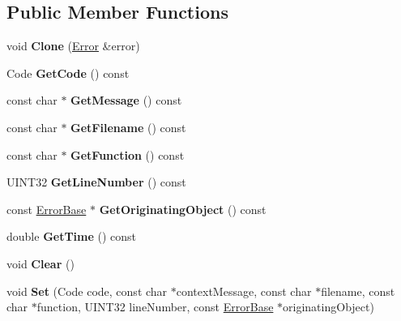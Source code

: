 \subsection*{Public Member Functions}
\begin{DoxyCompactItemize}
\item 
\hypertarget{classError_af403f873b9446aa1020c5b60d69a0eab}{
void {\bfseries Clone} (\hyperlink{classError}{Error} \&error)}
\label{classError_af403f873b9446aa1020c5b60d69a0eab}

\item 
\hypertarget{classError_aac48d824bf56f26e5c213f0f7454ec99}{
Code {\bfseries GetCode} () const }
\label{classError_aac48d824bf56f26e5c213f0f7454ec99}

\item 
\hypertarget{classError_a706aa3025b0d2b1430f503a7b3a3b713}{
const char $\ast$ {\bfseries GetMessage} () const }
\label{classError_a706aa3025b0d2b1430f503a7b3a3b713}

\item 
\hypertarget{classError_a1ecbf12fe24dac6f4c00da7895a4ff2f}{
const char $\ast$ {\bfseries GetFilename} () const }
\label{classError_a1ecbf12fe24dac6f4c00da7895a4ff2f}

\item 
\hypertarget{classError_a4944f2d37794eef96c6ddaca980c3fe0}{
const char $\ast$ {\bfseries GetFunction} () const }
\label{classError_a4944f2d37794eef96c6ddaca980c3fe0}

\item 
\hypertarget{classError_abf8a3ba03ce42ad1a04caa5c2e6cf84a}{
UINT32 {\bfseries GetLineNumber} () const }
\label{classError_abf8a3ba03ce42ad1a04caa5c2e6cf84a}

\item 
\hypertarget{classError_ac3a8fe161c7baad22e7da65389892a3c}{
const \hyperlink{classErrorBase}{ErrorBase} $\ast$ {\bfseries GetOriginatingObject} () const }
\label{classError_ac3a8fe161c7baad22e7da65389892a3c}

\item 
\hypertarget{classError_aa70dafb23425ece5045932d9b5e51d9a}{
double {\bfseries GetTime} () const }
\label{classError_aa70dafb23425ece5045932d9b5e51d9a}

\item 
\hypertarget{classError_afd919c7b9e33c2e630edee8072c31922}{
void {\bfseries Clear} ()}
\label{classError_afd919c7b9e33c2e630edee8072c31922}

\item 
\hypertarget{classError_ac3def8d75185839aecc68a1d5af75f6f}{
void {\bfseries Set} (Code code, const char $\ast$contextMessage, const char $\ast$filename, const char $\ast$function, UINT32 lineNumber, const \hyperlink{classErrorBase}{ErrorBase} $\ast$originatingObject)}
\label{classError_ac3def8d75185839aecc68a1d5af75f6f}

\end{DoxyCompactItemize}

